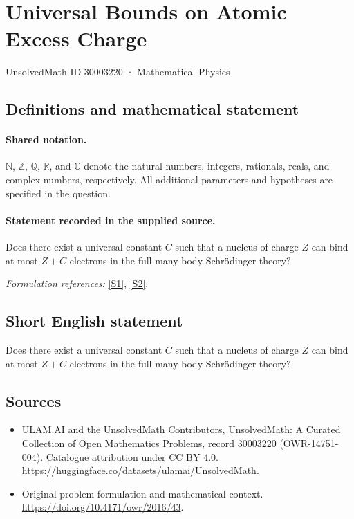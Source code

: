 \documentclass[11pt]{article}
\newcommand{\sref}[2]{\hyperlink{source:#1:#2}{[S#2]}}
\begin{document}
\setcounter{section}{30003219}
\section{Universal Bounds on Atomic Excess Charge}\label{30003220}
{\small UnsolvedMath ID 30003220 · Mathematical Physics}
\subsection{Definitions and mathematical statement}

\paragraph{Shared notation.}$\mathbb N$, $\mathbb Z$, $\mathbb Q$, $\mathbb R$, and $\mathbb C$ denote the natural numbers, integers, rationals, reals, and complex numbers, respectively. All additional parameters and hypotheses are specified in the question.


\paragraph{Statement recorded in the supplied source.}
Does there exist a universal constant $C$ such that a nucleus of charge $Z$ can bind at most $Z+C$ electrons in the full many-body Schrödinger theory?
\par\smallskip\textit{Formulation references:} \sref{30003220}{1}, \sref{30003220}{2}.
\subsection{Short English statement}
Does there exist a universal constant $C$ such that a nucleus of charge $Z$ can bind at most $Z+C$ electrons in the full many-body Schrödinger theory?
\subsection{Sources}
\begin{itemize}
\item[\hypertarget{source:30003220:1}{S1}] ULAM.AI and the UnsolvedMath Contributors, UnsolvedMath: A Curated Collection of Open Mathematics Problems, record 30003220 (OWR-14751-004). Catalogue attribution under CC BY 4.0.
\url{https://huggingface.co/datasets/ulamai/UnsolvedMath}.
\item[\hypertarget{source:30003220:2}{S2}] Original problem formulation and mathematical context.
\url{https://doi.org/10.4171/owr/2016/43}.
\end{itemize}
\label{end:30003220}
\end{document}
